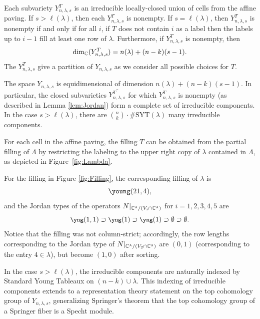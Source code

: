 \documentclass[12pt]{amsart}
\newcommand{\la}{\lambda}
\newcommand{\SYT}{\mathrm{SYT}}
\begin{document}
\begin{lemma}
\label{lem:Jordan}
Each subvariety $Y_{n,\la,s}^{T}$ is an irreducible locally-closed union of cells from the affine paving.
If $s>\ell(\la)$, then each $Y_{n,\la,s}^{T}$ is nonempty. If $s = \ell(\la)$, then $Y_{n,\la,s}^{T}$ is nonempty if and only if for all $i$, if $T$ does not contain $i$ as a label then the labels up to $i-1$ fill at least one row of $\lambda$. Furthermore, if $Y_{n,\la,s}^{T}$ is nonempty, then
\begin{align}\label{eq:DimFormulaForCmpt}
\dim_\bC(Y_{n,\la,s}^{T}) = n(\la) + (n-k)(s-1).
\end{align}
The $Y_{n,\la,s}^{T}$ give a partition of $Y_{n,\la,s}$ as we consider all possible choices for $T$.
\end{lemma}

\begin{theorem}
The space $Y_{n,\la,s}$ is equidimensional of dimension $n(\la) + (n-k)(s-1)$.  In particular, the closed subvarieties $\overline{Y_{n,\la,s}^{T}}$ for which $Y_{n,\la,s}^{T}$ is nonempty (as described in Lemma \ref{lem:Jordan}) form a complete set of irreducible components. In the case $s>\ell(\la)$, there are $\binom{n}{k}\cdot \#\SYT(\la)$ many irreducible components.
\end{theorem}

For each cell in the affine paving, the filling $T$ can be obtained from the partial filling of $\Lambda$ by restricting the labeling to the upper right copy of $\lambda$ contained in $\Lambda$, as depicted in Figure~\ref{fig:Lambda}.

\begin{example}
For the filling in Figure \ref{fig:Filling}, the corresponding filling of $\lambda$ is
\[\young(21,4),\]
and the Jordan types of the operators $N|_{\mathbb{C}^\lambda/(V_i\cap \mathbb{C}^\lambda)}$ for $i=1,2,3,4,5$ are
\[
{\small \yng(1,1)}\supset {\small \yng(1)}\supset {\small \yng(1)}\supset \emptyset \supset \emptyset.
\]
Notice that the filling was not column-strict; accordingly, the row lengths corresponding to the Jordan type of $N|_{\mathbb{C}^\lambda/(V_2\cap \mathbb{C}^\lambda)}$ are $(0, 1)$ (corresponding to the entry $4 \in \lambda$), but become $(1, 0)$ after sorting.
\end{example}

In the case $s>\ell(\la)$, the irreducible components are naturally indexed by Standard Young Tableaux on $(n-k) \cup \la$.  This indexing of irreducible components extends to a representation theory statement on the top cohomology group of $Y_{n,\lambda,s}$, generalizing Springer's theorem that the top cohomology group of a Springer fiber is a Specht module.
 
\end{document}
